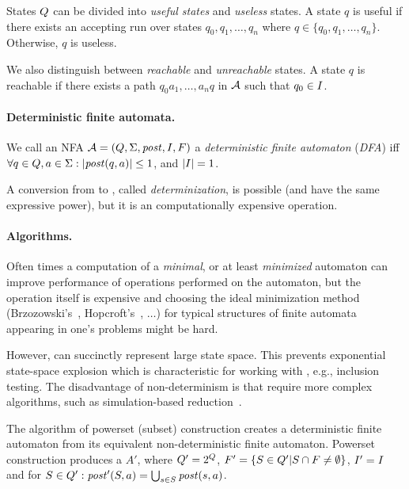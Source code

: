 States $Q$ can be divided into \emph{useful states} and \emph{useless} states.
A state $q$ is useful if there exists an accepting run over states $q_0, q_1, \ldots, q_n$ where $q \in \{ q_0, q_1, \ldots, q_n \}$.
Otherwise, $q$ is useless.

We also distinguish between \emph{reachable} and \emph{unreachable} states.
A state $q$ is reachable if there exists a path $q_0a_1, \ldots, a_nq$ in $\mathcal{A}$ such that $q_0 \in I$.


\paragraph{Deterministic finite automata.}
We call an NFA $\mathcal{A} = (Q, \Sigma
, \mathit{post}, I, F)$ a \emph{deterministic finite automaton} (\emph{DFA}) iff $\forall q \in Q, a \in \Sigma: |\mathit{post}(q, a)| \leq 1
$, and $|I| = 1$.

A conversion from \nfa to \dfa, called \emph{determinization}, is possible (\nfas and \dfas have the same expressive power), but it is an computationally expensive operation.

\paragraph{Algorithms.}

Often times a computation of a \emph{minimal}, or at least \emph{minimized} automaton can improve performance of operations performed on the automaton, but the operation itself is expensive and choosing the ideal minimization method (Brzozowski's~\cite{Brzozowski1962CanonicalRE}, Hopcroft's~\cite{hopcroft_71}, $\ldots$) for typical structures of finite automata appearing in one's problems might be hard.

However, \nfas can succinctly represent large state space.
This prevents exponential state-space explosion which is characteristic for working with \dfas, e.g., inclusion testing.
The disadvantage of non-determinism is that \nfas require more complex algorithms, such as simulation-based reduction~\cite{ranzato_efficient_2010, holik_optimizing_2009, HHK95}.

\begin{definition} \hfill \newline
    The algorithm of powerset (subset) construction creates a deterministic finite automaton from its equivalent non-deterministic finite automaton. Powerset construction produces a \dfa $A'$, where $Q' = 2^Q$, $F' = \{S \in Q' | S \cap F \neq \emptyset\}$, $I' = I$ and for $S \in Q': \mathit{post}'(S, a) = \bigcup_{s \in S} \mathit{post}(s, a)$.
\end{definition}

